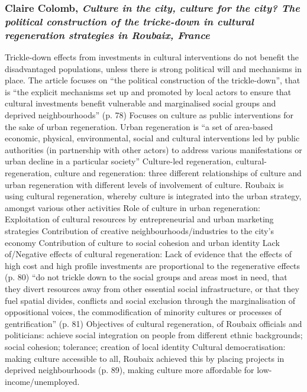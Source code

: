 \documentclass{article}
\begin{document}
\subsubsection{Claire Colomb, \textit{Culture in the city, culture for the city? The political construction of the tricke-down in cultural regeneration strategies in Roubaix, France}}

\begin{outline}
	\1 Trickle-down effects from investments in cultural interventions do not benefit the disadvantaged populations, unless there is strong political will and mechanisms in place. The article focuses on ``the political construction of the trickle-down'', that is ``the explicit mechanisms set up and promoted by local actors to ensure that cultural investments benefit vulnerable and marginalised social groups and deprived neighbourhoods'' (p. 78)
	\1 Focuses on culture as public interventions for the sake of urban regeneration. Urban regeneration is ``a set of area-based economic, physical, environmental, social and cultural interventions led by public authorities (in partnership with other actors) to address various manifestations or urban decline in a particular society''
	\1 Culture-led regeneration, cultural-regeneration, culture and regeneration: three different relationships of culture and urban regeneration with different levels of involvement of culture. Roubaix is using cultural regeneration, whereby culture is integrated into the urban strategy, amongst various other activities
	\1 Role of culture in urban regeneration:
		\2 Exploitation of cultural resources by entrepreneurial and urban marketing strategies
		\2 Contribution of creative neighbourhoods/industries to the city's economy
		\2 Contribution of culture to social cohesion and urban identity
	\1 Lack of/Negative effects of cultural regeneration:
		\2 Lack of evidence that the effects of high cost and high profile investments are proportional to the regenerative effects (p. 80)
		\2 ``do not trickle down to the social groups and areas most in need, that they divert resources away from other essential social infrastructure, or that they fuel spatial divides, conflicts and social exclusion through the marginalisation of oppositional voices, the commodification of minority cultures or processes of gentrification'' (p. 81)
	\1 Objectives of cultural regeneration, of Roubaix officials and politicians: achieve social integration on people from different ethnic backgrounds; social cohesion; tolerance; creation of local identity
	\1 Cultural democratisation: making culture accessible to all, Roubaix achieved this by placing projects in deprived neighbourhoods (p. 89), making culture more affordable for low-income/unemployed. 

\end{outline}
\end{document}
